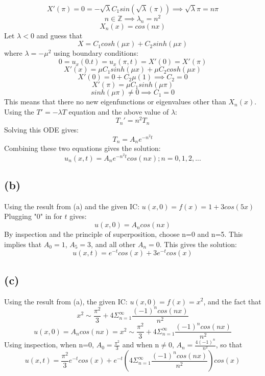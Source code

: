 \documentclass[preview,12pt]{article}
\begin{document}
        $$X'(\pi)=0=-\sqrt{\lambda}C_1sin(\sqrt{\lambda}(\pi)) \implies \sqrt{\lambda}\pi=n\pi$$
        $$n\in \mathbb{Z} \implies \lambda_n=n^2$$
        $$X_n(x)=cos(n x)$$
        Let $\lambda<0$ and guess that 
        $$X=C_1cosh(\mu x)+C_2sinh(\mu x)$$
        where $\lambda=-\mu^2$ \newline
        using boundary conditions:
        $$0=u_x(0.t)=u_x(\pi,t)=X'(0)=X'(\pi)$$
        $$X'(x)=\mu C_1 sinh(\mu x)+\mu C_2 cosh (\mu x)$$
        $$X'(0)=0+C_2 \mu (1) \implies C_2=0$$
        $$X'(\pi)=\mu C_1 sinh(\mu \pi)$$
        $$sinh(\mu\pi)\neq 0 \implies C_1=0$$
        This means that there no new eigenfunctions or eigenvalues other than $X_n(x)$. \newline
        Using the $T'=-\lambda T$ equation and the above value of $\lambda$: 
        $$T_n'=n^2T_n$$
        Solving this ODE gives:
        $$T_n=A_ne^{-n^2t}$$
        Combining these two equations gives the solution:
        $$u_n(x,t)=A_ne^{-n^2t}cos(n x); n=0,1,2,...$$
        
    \subsection*{(b)}
        Using the result from (a) and the given IC: $u(x,0)=f(x)=1+3cos(5x)$ \newline
        Plugging "0" in for $t$ gives:
        $$u(x,0)=A_ncos(nx)$$
        By inspection and the principle of superposition, choose n=0 and n=5.  This implies that $A_0=1$, $A_5=3$, and all other $A_n=0$. \newline
        This gives the solution:
        $$u(x,t)=e^{-t}cos(x)+3e^{-t}cos(x)$$
        
    \subsection*{(c)}
        Using the result from (a), the given IC: $u(x,0)=f(x)=x^2$, and the fact that 
        $$x^2\sim \frac{\pi^2}{3}+4\Sigma^\infty_{n=1}\frac{(-1)^ncos(nx)}{n^2}$$
        $$u(x,0)=A_ncos(nx)=x^2 \sim \frac{\pi^2}{3}+4\Sigma^\infty_{n=1}\frac{(-1)^ncos(nx)}{n^2}$$
        Using inspection, when n=0, $A_0=\frac{\pi^2}{3}$ and when n$\neq$0, $A_n=\frac{4(-1)^n}{n^2}$, so that
        $$u(x,t)=\frac{\pi^2}{3}e^{-t}cos(x)+e^{-t}\left(4\Sigma^\infty _{n=1}\frac{(-1)^ncos(nx)}{n^2}\right)cos(x)$$
        
\end{document}

